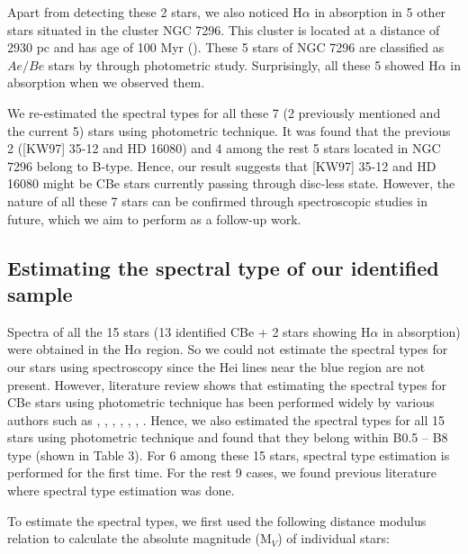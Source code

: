 \documentclass{jaa}
\begin{document}
Apart from detecting these 2 stars, we also noticed H$\alpha$ in absorption in 5 other stars situated in the cluster NGC 7296. This cluster is located at a distance of 2930 pc and has age of 100 Myr (\citealt{2005Netopil}). These 5 stars of NGC 7296 are classified as $Ae/Be$ stars by \cite{2005Netopil} through photometric study. Surprisingly, all these 5 showed H$\alpha$ in absorption when we observed them. 

We re-estimated the spectral types for all these 7 (2 previously mentioned and the current 5) stars using photometric technique. It was found that the previous 2 ([KW97] 35-12 and HD 16080) and 4 among the rest 5 stars located in NGC 7296 belong to B-type. Hence, our result suggests that [KW97] 35-12 and HD 16080 might be CBe stars currently passing through disc-less state. However, the nature of all these 7 stars can be confirmed through spectroscopic studies in future, which we aim to perform as a follow-up work. 

\subsection{Estimating the spectral type of our identified sample}
Spectra of all the 15 stars (13 identified CBe + 2 stars showing H$\alpha$ in absorption) were obtained in the H$\alpha$ region. So we could not estimate the spectral types for our stars using spectroscopy since the He{\sc i} lines near the blue region are not present. However, literature review shows that estimating the spectral types for CBe stars using photometric technique has been performed widely by various authors such as \cite{1993Halbedel}, \cite{2000Coe}, \cite{2001Torrej}, \cite{2001Beaulieu}, \cite{2005Kahabka}, \cite{2006Blay}, \cite{2014Scott}. Hence, we also estimated the spectral types for all 15 stars using photometric technique and found that they belong within B0.5 -- B8 type (shown in Table 3). For 6 among these 15 stars, spectral type estimation is performed for the first time. For the rest 9 cases, we found previous literature where spectral type estimation was done. 

To estimate the spectral types, we first used the following distance modulus relation to calculate the absolute magnitude (M$_{V}$) of individual stars:
\end{document}
